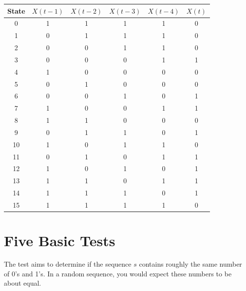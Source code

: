 \documentclass[12pt,openany]{book}
\theoremstyle{definition}
\begin{document}
\begin{table}[h]
	\centering
	\begin{tabular}{|c||c|c|c|c|c|}
		\hline
		\rowcolor{cyan} State & $X(t-1)$ & $X(t-2)$ & $X(t-3)$ & $X(t-4)$ & $X(t)$ \\
		\hline
		0 & \cellcolor{blue!20} 1 & \cellcolor{blue!20} 1 & \cellcolor{blue!20} 1 & \cellcolor{blue!20} 1 &  0\\
		\hline
		1 & 0 & 1 & 1 & 1 & 0 \\
		\hline
		2 & 0 & 0 & 1 & 1 & 0 \\
		\hline
		3 & 0 & 0 & 0 & 1 & 1 \\
		\hline
		4 & 1 & 0 & 0 & 0 & 0 \\
		\hline
		5 & 0 & 1 & 0 & 0 & 0 \\
		\hline
		6 & 0 & 0 & 1 & 0 & 1 \\
		\hline
		7 & 1 & 0 & 0 & 1 & 1 \\
		\hline
		8 & 1 & 1 & 0 & 0 & 0 \\
		\hline
		9 & 0 & 1 & 1 & 0 & 1 \\
		\hline
		10 & 1 & 0 & 1 & 1 & 0 \\
		\hline
		11 & 0 & 1 & 0 & 1 & 1 \\
		\hline
		12 & 1 & 0 & 1 & 0 & 1 \\
		\hline
		13 & 1 & 1 & 0 & 1 & 1 \\
		\hline
		14 & 1 & 1 & 1 & 0 & 1 \\
		\hline
		15 & \cellcolor{blue!20} 1 & \cellcolor{blue!20} 1 & \cellcolor{blue!20} 1 & \cellcolor{blue!20} 1 & 0 \\ %
		\hline
	\end{tabular}
\end{table}

\newpage
\section{Five Basic Tests}
The test aims to determine if the sequence 
$s$ contains roughly the same number of 0's and 1's. In a random sequence, you would expect these numbers to be about equal.
\end{document}
